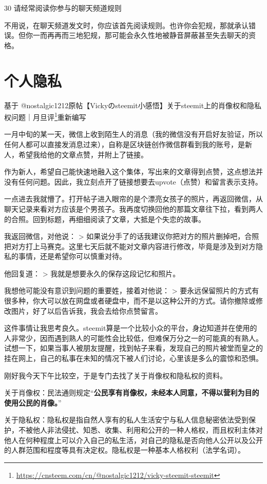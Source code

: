 \documentclass[]{ctexbook}
\renewcommand{\href}[2]{#2\footnote{\url{#1}}}
\begin{document}
30 请经常阅读你参与的聊天频道规则

不用说，在聊天频道发文时，你应该首先阅读规则。也许你会犯规，那就承认错误。但你一而再再而三地犯规，那可能会永久性地被静音屏蔽甚至失去聊天的资格。

\hypertarget{grys}{%
\section{个人隐私}\label{grys}}

基于 @nostalgic1212原帖\href{https://cnsteem.com/cn/@nostalgic1212/vicky-steemit-steemit}{【Vickyのsteemit小感悟】关于steemit上的肖像权和隐私权问题｜月旦评}重新编写

一月中旬的某一天，微信上收到陌生人的消息（我的微信没有开启好友验证，所以任何人都可以直接发消息过来），自称是区块链创作微信群看到我的账号，是新人，希望我给他的文章点赞，并附上了链接。

作为新人，希望自己能快速地融入这个集体，写出来的文章得到点赞，这点想法并没有任何问题。因此，我立刻点开了链接想要去upvote（点赞）和留言表示支持。

一点进去我就懵了。打开帖子进入眼帘的是个漂亮女孩子的照片，再返回微信，从聊天记录来看对方应该是个男孩子。我再度切换回他的那篇文章往下拉，看到两人的合照。回到标题，再细细阅读了文章，大抵是个失恋的故事。

我返回微信，对他说：
\textgreater{} 如果说分手了的话我建议你把对方的照片删掉吧，合照把对方打上马赛克。这里七天后就不能对文章内容进行修改，毕竟是涉及到对方隐私的事情，还是希望你可以慎重对待。

他回复道：
\textgreater{} 我就是想要永久的保存这段记忆和照片。

我想他可能没有意识到问题的重要姓，接着对他说：
\textgreater{} 要永远保留照片的方式有很多种，你大可以放在网盘或者硬盘中，而不是以这种公开的方式。请你撤除或修改图片，好了以后告诉我，我会去给你点赞留言。

这件事情让我思考良久。steemit算是一个比较小众的平台，身边知道并在使用的人非常少，因而遇到熟人的可能性会比较低，但难保万分之一的可能真的有熟人。试想一下，如果当事人被朋友提醒，找到帖子来看，发现自己的照片被堂而皇之的挂在网上，自己的私事在未知的情况下被人们讨论，心里该是多么的震惊和恐惧。

刚好我今天下午比较空，于是专门去找了关于肖像权和隐私权的资料。

关于肖像权：民法通则规定``\textbf{公民享有肖像权，未经本人同意，不得以营利为目的使用公民的肖像。}''

关于隐私权：隐私权是指自然人享有的私人生活安宁与私人信息秘密依法受到保护，不被他人非法侵扰、知悉、收集、利用和公开的一种人格权，而且权利主体对他人在何种程度上可以介入自己的私生活，对自己的隐私是否向他人公开以及公开的人群范围和程度等具有决定权。隐私权是一种基本人格权利（法学名词）。
\end{document}
